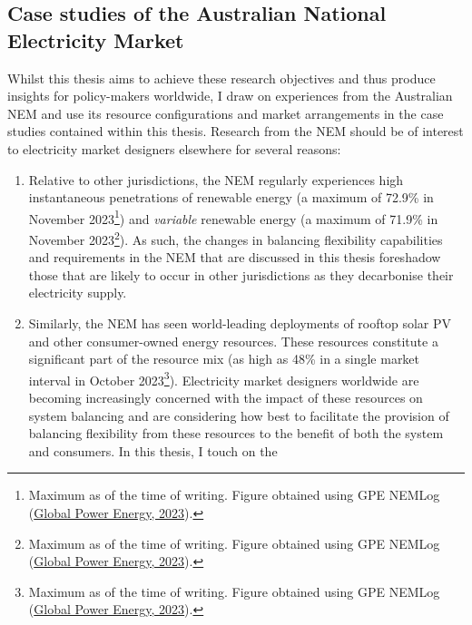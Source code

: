 \documentclass[12pt,a4paper,]{report}
\providecommand{\tightlist}{%
  \setlength{\itemsep}{0pt}\setlength{\parskip}{0pt}}
\begin{document}
\hypertarget{case-studies-of-the-australian-national-electricity-market}{%
\subsection{Case studies of the Australian National Electricity
Market}\label{case-studies-of-the-australian-national-electricity-market}}

Whilst this thesis aims to achieve these research objectives and thus
produce insights for policy-makers worldwide, I draw on experiences from
the Australian NEM and use its resource configurations and market
arrangements in the case studies contained within this thesis. Research
from the NEM should be of interest to electricity market designers
elsewhere for several reasons:

\begin{enumerate}
\def\labelenumi{\arabic{enumi}.}
\tightlist
\item
  Relative to other jurisdictions, the NEM regularly experiences high
  instantaneous penetrations of renewable energy (a maximum of 72.9\% in
  November 2023\footnote{Maximum as of the time of writing. Figure
    obtained using GPE NEMLog
    (\protect\hyperlink{ref-globalpowerenergyWelcomeGPENEMLog22023}{Global
    Power Energy, 2023}).}) and \emph{variable} renewable energy (a
  maximum of 71.9\% in November 2023\footnote{Maximum as of the time of
    writing. Figure obtained using GPE NEMLog
    (\protect\hyperlink{ref-globalpowerenergyWelcomeGPENEMLog22023}{Global
    Power Energy, 2023}).}). As such, the changes in balancing
  flexibility capabilities and requirements in the NEM that are
  discussed in this thesis foreshadow those that are likely to occur in
  other jurisdictions as they decarbonise their electricity supply.
\item
  Similarly, the NEM has seen world-leading deployments of rooftop solar
  PV and other consumer-owned energy resources. These resources
  constitute a significant part of the resource mix (as high as 48\% in
  a single market interval in October 2023\footnote{Maximum as of the
    time of writing. Figure obtained using GPE NEMLog
    (\protect\hyperlink{ref-globalpowerenergyWelcomeGPENEMLog22023}{Global
    Power Energy, 2023}).}). Electricity market designers worldwide are
  becoming increasingly concerned with the impact of these resources on
  system balancing and are considering how best to facilitate the
  provision of balancing flexibility from these resources to the benefit
  of both the system and consumers. In this thesis, I touch on the

\end{enumerate}
\end{document}
